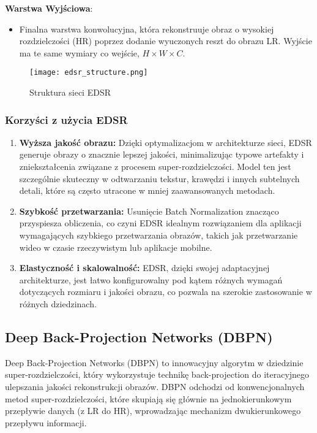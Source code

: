 \documentclass[10pt]{article}
\begin{document}
\textbf{Warstwa Wyjściowa}:
\begin{itemize}
    \item Finalna warstwa konwolucyjna, która rekonstruuje obraz o wysokiej rozdzielczości (HR) poprzez dodanie wyuczonych reszt do obrazu LR. Wyjście ma te same wymiary co wejście, \( H \times W \times C \).
\end{itemize}

\begin{figure}[h!]
    \centering
    \texttt{[image: edsr\_structure.png]}
    \caption{Struktura sieci EDSR}
    \label{fig:edsr_structure}
\end{figure}

\subsubsection*{Korzyści z użycia EDSR}

\begin{enumerate}
    \item \textbf{Wyższa jakość obrazu:} Dzięki optymalizacjom w architekturze sieci, EDSR generuje obrazy o znacznie lepszej jakości, minimalizując typowe artefakty i zniekształcenia związane z procesem super-rozdzielczości. Model ten jest szczególnie skuteczny w odtwarzaniu tekstur, krawędzi i innych subtelnych detali, które są często utracone w mniej zaawansowanych metodach.
    \item \textbf{Szybkość przetwarzania:} Usunięcie Batch Normalization znacząco przyspiesza obliczenia, co czyni EDSR idealnym rozwiązaniem dla aplikacji wymagających szybkiego przetwarzania obrazów, takich jak przetwarzanie wideo w czasie rzeczywistym lub aplikacje mobilne.
    \item \textbf{Elastyczność i skalowalność:} EDSR, dzięki swojej adaptacyjnej architekturze, jest łatwo konfigurowalny pod kątem różnych wymagań dotyczących rozmiaru i jakości obrazu, co pozwala na szerokie zastosowanie w różnych dziedzinach.
\end{enumerate}

\subsection*{Deep Back-Projection Networks (DBPN)}

Deep Back-Projection Networks (DBPN) to innowacyjny algorytm w dziedzinie super-rozdzielczości, który wykorzystuje technikę back-projection do iteracyjnego ulepszania jakości rekonstrukcji obrazów. DBPN odchodzi od konwencjonalnych metod super-rozdzielczości, które skupiają się głównie na jednokierunkowym przepływie danych (z LR do HR), wprowadzając mechanizm dwukierunkowego przepływu informacji.
\end{document}
